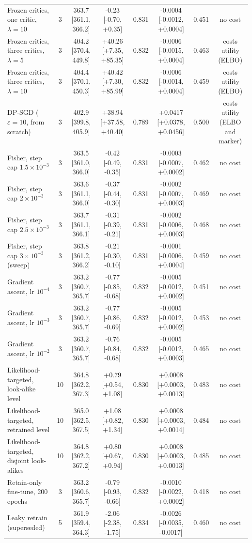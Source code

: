 \begin{tabular}{lccccccc}
Frozen critics, one critic, $\lambda=10$ & 3 & 363.7 [361.1, 366.2] & -0.23 [-0.70, +0.35] & 0.831 & -0.0004 [-0.0012, +0.0004] & 0.451 & no cost \\
Frozen critics, three critics, $\lambda=5$ & 3 & 404.2 [370.4, 449.8] & +40.26 [+7.35, +85.35] & 0.832 & -0.0006 [-0.0015, +0.0004] & 0.463 & costs utility (ELBO) \\
Frozen critics, three critics, $\lambda=10$ & 3 & 404.4 [370.1, 450.3] & +40.42 [+7.30, +85.99] & 0.832 & -0.0006 [-0.0014, +0.0004] & 0.459 & costs utility (ELBO) \\
DP-SGD ($\varepsilon=10$, from scratch) & 3 & 402.9 [399.8, 405.9] & +38.94 [+37.58, +40.40] & 0.789 & +0.0417 [+0.0378, +0.0456] & 0.500 & costs utility (ELBO and marker) \\
\midrule
Fisher, step cap $1.5\times 10^{-3}$ & 3 & 363.5 [361.0, 366.0] & -0.42 [-0.49, -0.35] & 0.831 & -0.0003 [-0.0007, +0.0002] & 0.462 & no cost \\
Fisher, step cap $2\times 10^{-3}$ & 3 & 363.6 [361.1, 366.0] & -0.37 [-0.44, -0.30] & 0.831 & -0.0002 [-0.0007, +0.0003] & 0.469 & no cost \\
Fisher, step cap $2.5\times 10^{-3}$ & 3 & 363.7 [361.1, 366.1] & -0.31 [-0.39, -0.21] & 0.831 & -0.0002 [-0.0006, +0.0003] & 0.468 & no cost \\
Fisher, step cap $3\times 10^{-3}$ (sweep) & 3 & 363.8 [361.2, 366.2] & -0.21 [-0.30, -0.10] & 0.831 & -0.0001 [-0.0006, +0.0004] & 0.459 & no cost \\
Gradient ascent, lr $10^{-4}$ & 3 & 363.2 [360.7, 365.7] & -0.77 [-0.85, -0.68] & 0.832 & -0.0005 [-0.0012, +0.0002] & 0.451 & no cost \\
Gradient ascent, lr $10^{-3}$ & 3 & 363.2 [360.7, 365.7] & -0.77 [-0.86, -0.69] & 0.832 & -0.0005 [-0.0012, +0.0002] & 0.453 & no cost \\
Gradient ascent, lr $10^{-2}$ & 3 & 363.2 [360.7, 365.7] & -0.76 [-0.84, -0.68] & 0.832 & -0.0005 [-0.0012, +0.0003] & 0.465 & no cost \\
Likelihood-targeted, look-alike level & 10 & 364.8 [362.2, 367.3] & +0.79 [+0.54, +1.08] & 0.830 & +0.0008 [+0.0003, +0.0013] & 0.483 & no cost \\
Likelihood-targeted, retrained level & 10 & 365.0 [362.5, 367.5] & +1.08 [+0.82, +1.34] & 0.830 & +0.0008 [+0.0003, +0.0014] & 0.484 & no cost \\
Likelihood-targeted, disjoint look-alikes & 10 & 364.8 [362.2, 367.2] & +0.80 [+0.67, +0.94] & 0.830 & +0.0008 [+0.0003, +0.0013] & 0.485 & no cost \\
Retain-only fine-tune, 200 epochs & 3 & 363.2 [360.6, 365.7] & -0.79 [-0.93, -0.66] & 0.832 & -0.0010 [-0.0022, +0.0002] & 0.418 & no cost \\
Leaky retrain (superseded) & 5 & 361.9 [359.4, 364.3] & -2.06 [-2.38, -1.75] & 0.834 & -0.0026 [-0.0035, -0.0017] & 0.460 & no cost \\
\bottomrule
\end{tabular}
